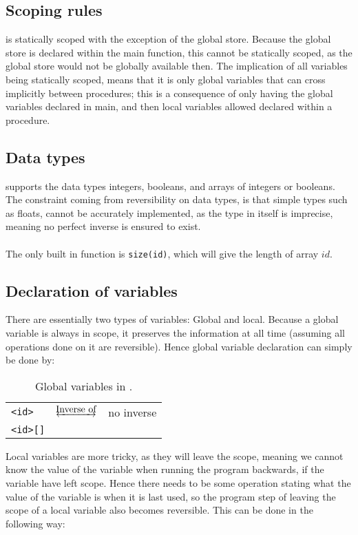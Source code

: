 \subsection{Scoping rules}
\lan is statically scoped with the exception of the global store. Because the global store is
declared within the main function, this cannot be statically scoped, as the global store would not
be globally available then. The implication of all variables being statically scoped, means that it is only
global variables that can cross implicitly between procedures; this is a consequence of only
having the global variables declared in main, and then local variables allowed declared within a
procedure.

\subsection{Data types}
\lan supports the data types integers, booleans, and arrays of integers or booleans.
The constraint coming from reversibility on data types, is that simple types such as floats,
cannot be accurately implemented, as the type in itself is imprecise, meaning no perfect inverse
is ensured to exist.
\\
\\
The only built in function is \texttt{size(id)}, which will give the length of array $id$.

\subsection{Declaration of variables}
There are essentially two types of variables: Global and local. Because a global variable is
always in scope, it preserves the information at all time (assuming all operations done on it
are reversible). Hence global variable declaration can simply be done by:

\begin{table*}[h]
    \centering
    \begin{tabular}{lcl}
        \texttt{<id>} & $\underleftrightarrow{\text{Inverse of}}$ & no inverse \\
        \texttt{<id>[]}
    \end{tabular}
    \caption{Global variables in \lan.}
\end{table*}
\noindent
Local variables are more tricky, as they will leave the scope, meaning we cannot know the value
of the variable when running the program backwards, if the variable have left scope. Hence there
needs to be some operation stating what the value of the variable is when it is last used, so
the program step of leaving the scope of a local variable also becomes reversible. This can be
done in the following way:

